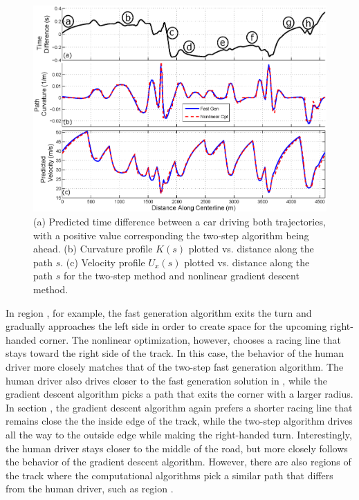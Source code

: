 \documentclass[twocolumn,10pt]{asme2ej}
\newcommand*\circled[1]{\tikz[baseline=(char.base)]{
            \node[shape=circle,draw,inner sep=2pt] (char) {#1};}}
\begin{document}
\begin{figure}[tb]
\centering
\includegraphics[width=6.8 in]{figures/simData.eps}
\caption{(a) Predicted time difference between a car driving both trajectories, with a positive
value corresponding the two-step algorithm being ahead. (b) Curvature profile $K(s)$ plotted vs. distance along the path $s$.
 (c) Velocity profile $U_x(s)$ plotted 
vs. distance along the path $s$ for the two-step method and nonlinear gradient descent method.}
\label{fig:simData}
\end{figure}

In region \circled{b}, for example, the fast generation algorithm exits the turn and gradually approaches the left side in order to create space for the
upcoming right-handed corner.  The nonlinear optimization, however, chooses a racing line that stays toward the right side of the track. In this case,
the behavior of the human driver more closely matches that of the two-step fast generation algorithm. The human driver also drives closer to the 
fast generation solution in \circled{h}, while the gradient descent algorithm picks a path that exits the corner with a larger radius. In section \circled{c}, the gradient descent
algorithm again prefers a shorter racing line that remains close the the inside edge of the track, while the two-step algorithm drives all the way
to the outside edge while making the right-handed turn. Interestingly, the human driver stays closer to the middle of the road, but more closely
follows the behavior of the gradient descent algorithm. However, there are also regions of the track where the computational algorithms pick a similar path that 
differs from the human driver, such as region \circled{d}.
 
\end{document}
